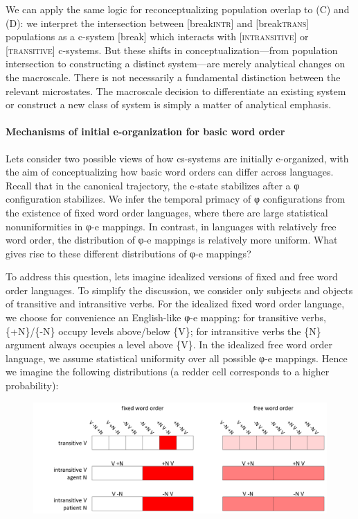   We can apply the same logic for reconceptualizing population overlap to (C) and (D): we interpret the intersection between [break\textsc{intr}] and [break\textsc{trans}] populations as a c-system [break] which interacts with [\textsc{intransitive}] or [\textsc{transitive}] c-systems. But these shifts in conceptualization—from population intersection to constructing a distinct system—are merely analytical changes on the macroscale. There is not necessarily a fundamental distinction between the relevant microstates. The macroscale decision to differentiate an existing system or construct a new class of system is simply a matter of analytical emphasis.

\paragraph{Mechanisms of initial e-organization for basic word order}

Lets consider two possible views of how cs-systems are initially e-organized, with the aim of conceptualizing how basic word orders can differ across languages. Recall that in the canonical trajectory, the e-state stabilizes after a φ configuration stabilizes. We infer the temporal primacy of φ configurations from the existence of fixed word order languages, where there are large statistical nonuniformities in φ-e mappings. In contrast, in languages with relatively free word order, the distribution of φ-e mappings is relatively more uniform. What gives rise to these different distributions of φ-e mappings?

  To address this question, lets imagine idealized versions of fixed and free word order languages. To simplify the discussion, we consider only subjects and objects of transitive and intransitive verbs. For the idealized fixed word order language, we choose for convenience an English-like φ-e mapping: for transitive verbs, \{+N\}/\{-N\} occupy levels above/below \{V\}; for intransitive verbs the \{N\} argument always occupies a level above \{V\}. In the idealized free word order language, we assume statistical uniformity over all possible φ-e mappings. Hence we imagine the following distributions (a redder cell corresponds to a higher probability):

  
\begin{figure}
\includegraphics[width=\textwidth]{figures/Tilsen-img74.png}
\caption{\missingcaption}
\label{fig:}
\end{figure}
 

